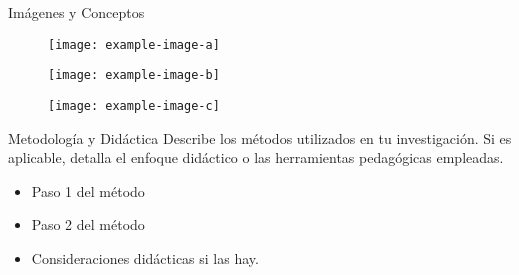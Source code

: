 \documentclass[final]{beamer}
\begin{document}
\begin{frame}[t]
\begin{columns}[T]
\begin{column}{0.48\textwidth}
        \begin{block}{Imágenes y Conceptos}
            \begin{figure}
                \centering
                \texttt{[image: example-image-a]}
            \end{figure}
            \vspace{0.5cm}
            \begin{figure}
                \centering
                \texttt{[image: example-image-b]}
            \end{figure}
            \vspace{0.5cm}
            \begin{figure}
                \centering
                \texttt{[image: example-image-c]}
            \end{figure}
        \end{block}

        \begin{block}{Metodología y Didáctica}
            Describe los métodos utilizados en tu investigación. Si es aplicable,
            detalla el enfoque didáctico o las herramientas pedagógicas empleadas.
            \begin{itemize}
                \item Paso 1 del método
                \item Paso 2 del método
                \item Consideraciones didácticas si las hay.
            \end{itemize}
        \end{block}

    \end{column}


\end{columns}
\end{frame}
\end{document}
